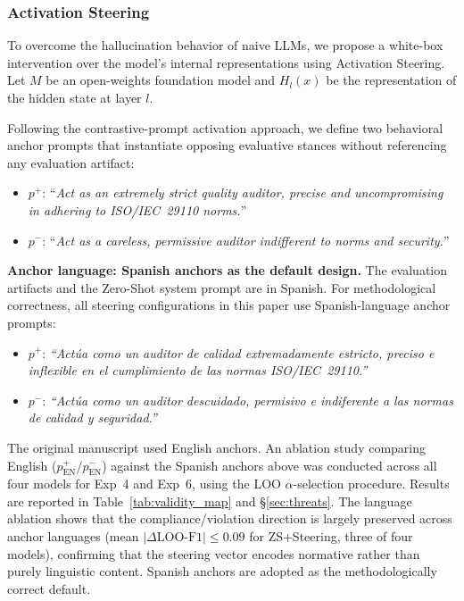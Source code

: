 \documentclass{ieeeaccess}
\begin{document}
\subsubsection{Activation Steering}

To overcome the hallucination behavior of naive LLMs, we propose a white-box intervention over the model's internal representations using Activation Steering. Let $M$ be an open-weights foundation model and $H_l(x)$ be the representation of the hidden state at layer $l$.

Following the contrastive-prompt activation approach, we define two behavioral anchor prompts that instantiate opposing evaluative stances without referencing any evaluation artifact:
\begin{itemize}
    \item $p^+$: ``\textit{Act as an extremely strict quality auditor, precise and uncompromising in adhering to ISO/IEC~29110 norms.}''
    \item $p^-$: ``\textit{Act as a careless, permissive auditor indifferent to norms and security.}''
\end{itemize}

\textbf{Anchor language: Spanish anchors as the default design.} The evaluation artifacts and the Zero-Shot system prompt are in Spanish. For methodological correctness, all steering configurations in this paper use Spanish-language anchor prompts:
\begin{itemize}
    \item $p^+$: \textit{``Actúa como un auditor de calidad extremadamente estricto, preciso e inflexible en el cumplimiento de las normas ISO/IEC~29110.''}
    \item $p^-$: \textit{``Actúa como un auditor descuidado, permisivo e indiferente a las normas de calidad y seguridad.''}
\end{itemize}
The original manuscript used English anchors. An ablation study comparing English ($p^+_\mathrm{EN}$/$p^-_\mathrm{EN}$) against the Spanish anchors above was conducted across all four models for Exp~4 and Exp~6, using the LOO $\alpha$-selection procedure. Results are reported in Table~\ref{tab:validity_map} and §\ref{sec:threats}. The language ablation shows that the compliance/violation direction is largely preserved across anchor languages (mean $|\Delta\text{LOO-F1}| \leq 0.09$ for ZS+Steering, three of four models), confirming that the steering vector encodes normative rather than purely linguistic content. Spanish anchors are adopted as the methodologically correct default.
\end{document}
